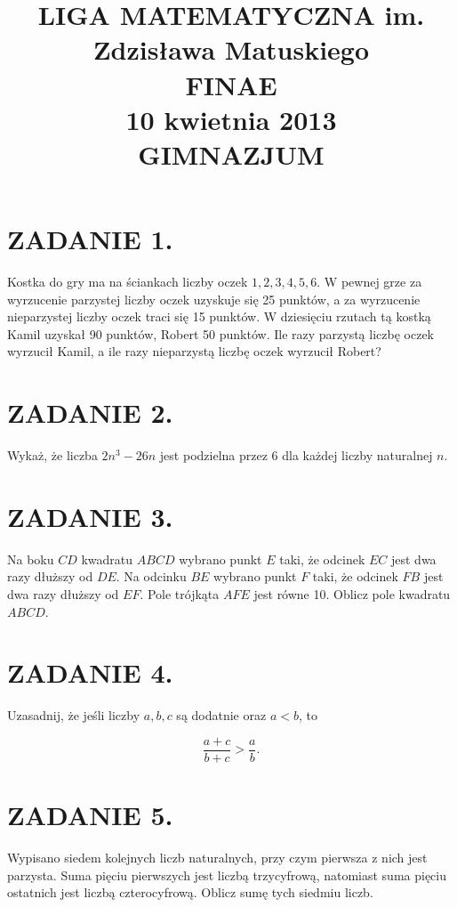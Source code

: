 \documentclass[10pt]{article}
\title{LIGA MATEMATYCZNA im. Zdzisława Matuskiego \\
 FINAE \\
 10 kwietnia 2013 \\
 GIMNAZJUM }
\author{}
\date{}
\begin{document}
\maketitle
\section*{ZADANIE 1.}
Kostka do gry ma na ściankach liczby oczek \(1,2,3,4,5,6\). W pewnej grze za wyrzucenie parzystej liczby oczek uzyskuje się 25 punktów, a za wyrzucenie nieparzystej liczby oczek traci się 15 punktów. W dziesięciu rzutach tą kostką Kamil uzyskał 90 punktów, Robert 50 punktów. Ile razy parzystą liczbę oczek wyrzucił Kamil, a ile razy nieparzystą liczbę oczek wyrzucił Robert?

\section*{ZADANIE 2.}
Wykaż, że liczba \(2 n^{3}-26 n\) jest podzielna przez 6 dla każdej liczby naturalnej \(n\).

\section*{ZADANIE 3.}
Na boku \(C D\) kwadratu \(A B C D\) wybrano punkt \(E\) taki, że odcinek \(E C\) jest dwa razy dłuższy od \(D E\). Na odcinku \(B E\) wybrano punkt \(F\) taki, że odcinek \(F B\) jest dwa razy dłuższy od \(E F\). Pole trójkąta \(A F E\) jest równe 10. Oblicz pole kwadratu \(A B C D\).

\section*{ZADANIE 4.}
Uzasadnij, że jeśli liczby \(a, b, c\) są dodatnie oraz \(a<b\), to

\[
\frac{a+c}{b+c}>\frac{a}{b} .
\]

\section*{ZADANIE 5.}
Wypisano siedem kolejnych liczb naturalnych, przy czym pierwsza z nich jest parzysta. Suma pięciu pierwszych jest liczbą trzycyfrową, natomiast suma pięciu ostatnich jest liczbą czterocyfrową. Oblicz sumę tych siedmiu liczb.
\end{document}
